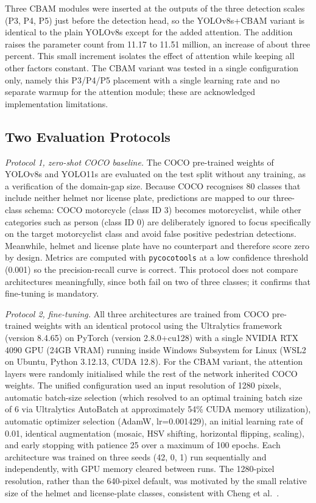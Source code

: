 \documentclass[conference]{IEEEtran}
\begin{document}
Three CBAM modules were inserted at the outputs of the three detection scales (P3, P4, P5) just before the detection head, so the YOLOv8s+CBAM variant is identical to the plain YOLOv8s except for the added attention. The addition raises the parameter count from 11.17 to 11.51 million, an increase of about three percent. This small increment isolates the effect of attention while keeping all other factors constant. The CBAM variant was tested in a single configuration only, namely this P3/P4/P5 placement with a single learning rate and no separate warmup for the attention module; these are acknowledged implementation limitations.

\subsection{Two Evaluation Protocols}

\textit{Protocol 1, zero-shot COCO baseline.} The COCO pre-trained weights of YOLOv8s and YOLO11s are evaluated on the test split without any training, as a verification of the domain-gap size. Because COCO recognises 80 classes that include neither helmet nor license plate, predictions are mapped to our three-class schema: COCO motorcycle (class ID 3) becomes motorcyclist, while other categories such as person (class ID 0) are deliberately ignored to focus specifically on the target motorcyclist class and avoid false positive pedestrian detections. Meanwhile, helmet and license plate have no counterpart and therefore score zero by design. Metrics are computed with \texttt{pycocotools} at a low confidence threshold (0.001) so the precision-recall curve is correct. This protocol does not compare architectures meaningfully, since both fail on two of three classes; it confirms that fine-tuning is mandatory.

\textit{Protocol 2, fine-tuning.} All three architectures are trained from COCO pre-trained weights \cite{ref14} with an identical protocol using the Ultralytics framework (version 8.4.65) \cite{ref6} on PyTorch (version 2.8.0+cu128) with a single NVIDIA RTX 4090 GPU (24GB VRAM) running inside Windows Subsystem for Linux (WSL2 on Ubuntu, Python 3.12.13, CUDA 12.8). For the CBAM variant, the attention layers were randomly initialised while the rest of the network inherited COCO weights. The unified configuration used an input resolution of 1280 pixels, automatic batch-size selection (which resolved to an optimal training batch size of 6 via Ultralytics AutoBatch at approximately 54\% CUDA memory utilization), automatic optimizer selection (AdamW, lr=0.001429), an initial learning rate of 0.01, identical augmentation (mosaic, HSV shifting, horizontal flipping, scaling), and early stopping with patience 25 over a maximum of 100 epochs. Each architecture was trained on three seeds (42, 0, 1) run sequentially and independently, with GPU memory cleared between runs. The 1280-pixel resolution, rather than the 640-pixel default, was motivated by the small relative size of the helmet and license-plate classes, consistent with Cheng et al.\ \cite{ref23}.
\end{document}
